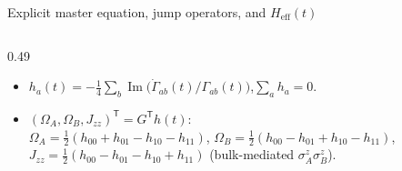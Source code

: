 \documentclass[aspectratio=169,11pt]{beamer}
\newcommand{\Heff}{H_{\mathrm{eff}}}
\begin{document}
\begin{frame}{Explicit master equation, jump operators, and \texorpdfstring{$\Heff(t)$}{H\_eff(t)}}
\begin{columns}[T,totalwidth=\textwidth]
\begin{column}{0.49\textwidth}
{\[\]}
\begin{itemize}\scriptsize\setlength\itemsep{2.5pt}
\item $h_a(t)=-\tfrac14\sum_b\operatorname{Im}\bigl(\dot\Gamma_{ab}(t)/\Gamma_{ab}(t)\bigr)$,\quad $\sum_a h_a=0$.
\item $(\Omega_A,\Omega_B,J_{zz})^{\mathsf T}=G^{\mathsf T}h(t)$:\\[1pt]
$\Omega_A=\tfrac12(h_{00}+h_{01}-h_{10}-h_{11})$,\;
$\Omega_B=\tfrac12(h_{00}-h_{01}+h_{10}-h_{11})$,\\[1pt]
$J_{zz}=\tfrac12(h_{00}-h_{01}-h_{10}+h_{11})$ (bulk-mediated $\sigma_A^z\sigma_B^z$).
\end{itemize}
\end{column}
\end{columns}
\end{frame}
\end{document}
